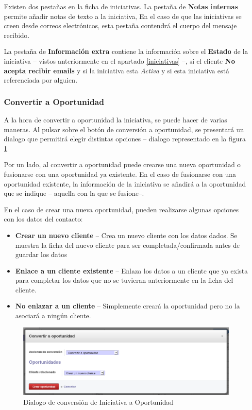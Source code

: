 Existen dos pestañas en la ficha de iniciativas. La pestaña de \textbf{Notas internas} permite añadir notas de texto a la iniciativa, En el caso de que las iniciativas se creen desde correos electrónicos, esta pestaña contendrá el cuerpo del mensaje recibido.

La pestaña de \textbf{Información extra} contiene la información sobre el \textbf{Estado} de la iniciativa -- vistos anteriormente en el apartado \ref{iniciativas} --, si el cliente \textbf{No acepta recibir emails} y si la iniciativa esta \emph{Activa} y si esta iniciativa está referenciada por alguien.


\subsubsection{Convertir a Oportunidad}
A la hora de convertir a oportunidad la iniciativa, se puede hacer de varias maneras. Al pulsar sobre el botón de conversión a oportunidad, se presentará un dialogo que permitirá elegir distintas opciones -- dialogo representado en la figura \ref{ven:iniaopo}

Por un lado, al convertir a oportunidad puede crearse una nueva oportunidad o fusionarse con una oportunidad ya existente. En el caso de fusionarse con una oportunidad existente, la información de la iniciativa se añadirá a la oportunidad que se indique -- aquella con la que se fusione--.

En el caso de crear una nueva oportunidad, pueden realizarse algunas opciones con los datos del contacto:

\begin{itemize}
  \item \textbf{Crear un nuevo cliente} -- Crea un nuevo cliente con los datos dados. Se muestra la 
        ficha del nuevo cliente para ser completada/confirmada antes de guardar los datos
  \item \textbf{Enlace a un cliente existente} -- Enlaza los datos a un cliente que ya exista para 
        completar los datos que no se tuvieran anteriormente en la ficha del cliente.
  \item \textbf{No enlazar a un cliente} -- Simplemente creará la oportunidad pero no la asociará a 
        ningún cliente.
\end{itemize}

\begin{figure}[H]
\includegraphics[width=\textwidth]{ventas/img/ven_iniaopo.png}
\caption{Dialogo de conversión de Iniciativa a Oportunidad}
\label{ven:iniaopo}
\end{figure}



